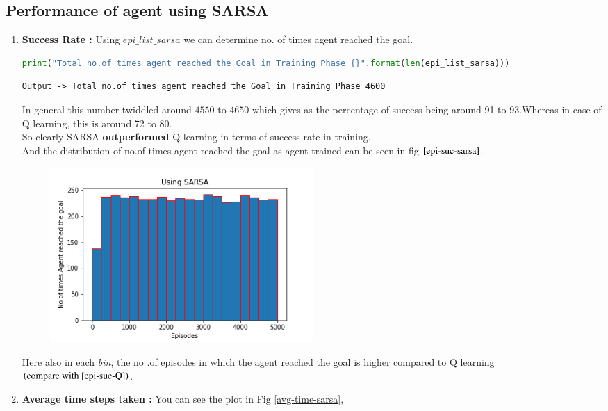 \documentclass[journal,12pt,onecolumn]{IEEEtran}
\theoremstyle{remark}
\numberwithin{equation}{section}
\begin{document}
 \subsection{Performance of agent using SARSA}
   \begin{enumerate}
	
   \item \textbf{Success Rate :} Using $epi\_list\_sarsa$ we can determine no. of times agent reached the goal. 
\begin{lstlisting}[language = Python]
print("Total no.of times agent reached the Goal in Training Phase {}".format(len(epi_list_sarsa)))
            \end{lstlisting}
            \begin{lstlisting}
Output -> Total no.of times agent reached the Goal in Training Phase 4600
            \end{lstlisting}
	    In general this number twiddled around $4550$ to $4650$ which gives as the percentage of success being around 91 to 93.Whereas in case of Q learning, this is around 72 to 80.\\
       	    So clearly SARSA \textbf{outperformed} Q learning in terms of success rate in training. \\
	And the distribution of no.of times agent reached the goal as agent trained can be seen in fig $\ref{epi-suc-sarsa}$,
	\begin{figure}[ht]
		      \centering
		      \includegraphics[width = 10cm]{Figs/hist_sarsa.png}
                      \caption{}
		      \label{epi-suc-sarsa}
	      \end{figure}
	 Here also in each \textit{bin}, the no .of episodes in which the agent reached the goal is higher compared to Q learning $(\text{compare with \ref{epi-suc-Q}})$. 
 \item \textbf{Average time steps taken :} You can see the plot in Fig \ref{avg-time-sarsa},


\end{enumerate}
\end{document}
